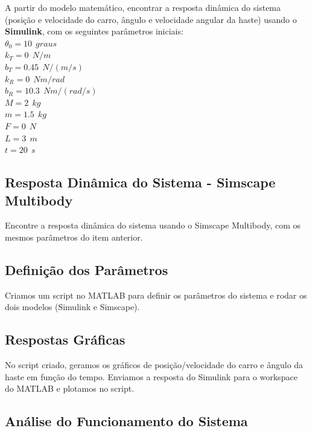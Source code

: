 \documentclass[a4paper, 12pt]{article}
\begin{document}
A partir do modelo matemático, encontrar a resposta dinâmica do sistema (posição e velocidade do carro, ângulo e velocidade angular da haste) usando o \textbf{Simulink}, com os seguintes parâmetros iniciais:\\


$\theta_0 = 10 \>\ graus$\\
$k_T = 0 \>\ N/m$\\
$b_T = 0.45\>\ N/(m/s)$\\
$k_R = 0 \>\ Nm/rad$\\
$b_R = 10.3 \>\ Nm/(rad/s)$\\
$M = 2 \>\ kg$\\
$m = 1.5 \>\ kg$\\
$F = 0\>\ N$\\
$L = 3 \>\ m$\\
$t = 20 \>\ s$\\




\subsection{Resposta Dinâmica do Sistema - Simscape Multibody}

Encontre a resposta dinâmica do sistema usando o Simscape Multibody, com os mesmos parâmetros do item anterior.

\subsection{Definição dos Parâmetros}

Criamos um script no MATLAB para definir os parâmetros do sistema e rodar os dois modelos
(Simulink e Simscape).

\subsection{Respostas Gráficas}

No script criado, geramos os gráficos de posição/velocidade do carro e ângulo da haste em função do tempo. Enviamos a resposta do Simulink para o workspace do MATLAB e plotamos no script.

\subsection{Análise do Funcionamento do Sistema}
\end{document}
